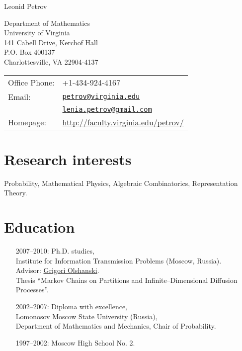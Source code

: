 \documentclass[letterpaper,11pt]{article}
\def\name{Leonid Petrov}
\begin{document}
{\huge \name}


\vspace{0.25in}

\begin{minipage}{0.45\linewidth}
  Department of Mathematics\\
	University of Virginia\\
	141 Cabell Drive, Kerchof Hall\\
	P.O. Box 400137\\
	Charlottesville, VA 22904-4137
\end{minipage}
\begin{minipage}{0.45\linewidth}
  \begin{tabular}{ll}
    Office Phone: & +1-434-924-4167 \\
    Email: & 
    \href{mailto:petrov@virginia.edu}{\tt petrov@virginia.edu}\\&
    \href{mailto:lenia.petrov@gmail.com}{\tt lenia.petrov@gmail.com}
    \\
    Homepage: & \url{http://faculty.virginia.edu/petrov/} \\
  \end{tabular}
\end{minipage}

\section*{Research interests}

Probability, Mathematical Physics, Algebraic Combinatorics, Representation Theory.

\section*{Education}

\begin{itemize}
  \item[2007--2010:]
  Ph.D. studies,\\Institute for Information Transmission Problems (Moscow, Russia).
  \\
  Advisor: \href{http://www.iitp.ru/en/userpages/88/}{Grigori Olshanski}.\\
  Thesis ``Markov Chains on Partitions and Infinite--Dimensional Diffusion Processes''.

  \item[2002--2007:]
  Diploma with excellence,\\
  Lomonosov Moscow State University (Russia),\\ Department of Mathematics and Mechanics, Chair of Probability.

  \item 
  [1997--2002:] Moscow High School No. 2.

\end{itemize}
\end{document}
